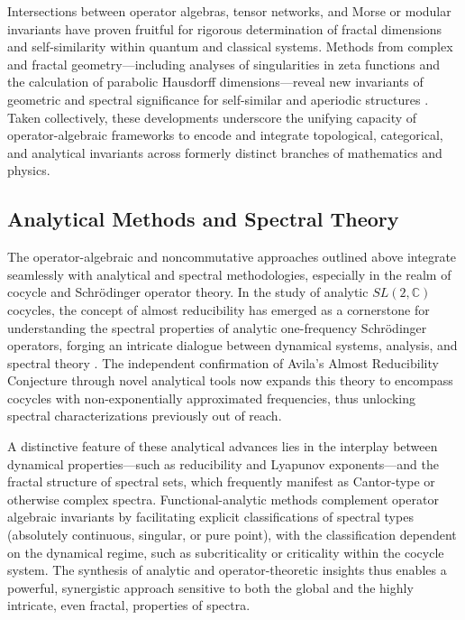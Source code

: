 \documentclass[sigconf]{acmart}
\begin{document}
Intersections between operator algebras, tensor networks, and Morse or modular invariants have proven fruitful for rigorous determination of fractal dimensions and self-similarity within quantum and classical systems. Methods from complex and fractal geometry—including analyses of singularities in zeta functions and the calculation of parabolic Hausdorff dimensions—reveal new invariants of geometric and spectral significance for self-similar and aperiodic structures \cite{ref2,ref19,ref14}. Taken collectively, these developments underscore the unifying capacity of operator-algebraic frameworks to encode and integrate topological, categorical, and analytical invariants across formerly distinct branches of mathematics and physics.

\subsection{Analytical Methods and Spectral Theory}

The operator-algebraic and noncommutative approaches outlined above integrate seamlessly with analytical and spectral methodologies, especially in the realm of cocycle and Schrödinger operator theory. In the study of analytic $SL(2,\mathbb{C})$ cocycles, the concept of almost reducibility has emerged as a cornerstone for understanding the spectral properties of analytic one-frequency Schrödinger operators, forging an intricate dialogue between dynamical systems, analysis, and spectral theory \cite{ref91}. The independent confirmation of Avila's Almost Reducibility Conjecture through novel analytical tools now expands this theory to encompass cocycles with non-exponentially approximated frequencies, thus unlocking spectral characterizations previously out of reach.

A distinctive feature of these analytical advances lies in the interplay between dynamical properties—such as reducibility and Lyapunov exponents—and the fractal structure of spectral sets, which frequently manifest as Cantor-type or otherwise complex spectra. Functional-analytic methods complement operator algebraic invariants by facilitating explicit classifications of spectral types (absolutely continuous, singular, or pure point), with the classification dependent on the dynamical regime, such as subcriticality or criticality within the cocycle system. The synthesis of analytic and operator-theoretic insights thus enables a powerful, synergistic approach sensitive to both the global and the highly intricate, even fractal, properties of spectra.
\end{document}
